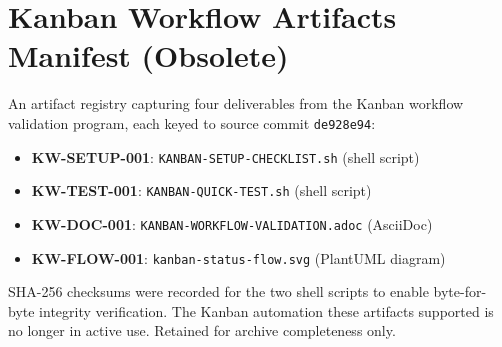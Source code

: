 
\section*{Kanban Workflow Artifacts Manifest (Obsolete)}

An artifact registry capturing four deliverables from the Kanban workflow
validation program, each keyed to source commit \texttt{de928e94}:

\begin{itemize}
  \item \textbf{KW-SETUP-001}: \texttt{KANBAN-SETUP-CHECKLIST.sh} (shell script)
  \item \textbf{KW-TEST-001}: \texttt{KANBAN-QUICK-TEST.sh} (shell script)
  \item \textbf{KW-DOC-001}: \texttt{KANBAN-WORKFLOW-VALIDATION.adoc} (AsciiDoc)
  \item \textbf{KW-FLOW-001}: \texttt{kanban-status-flow.svg} (PlantUML diagram)
\end{itemize}

SHA-256 checksums were recorded for the two shell scripts to enable
byte-for-byte integrity verification. The Kanban automation these artifacts
supported is no longer in active use. Retained for archive completeness only.
